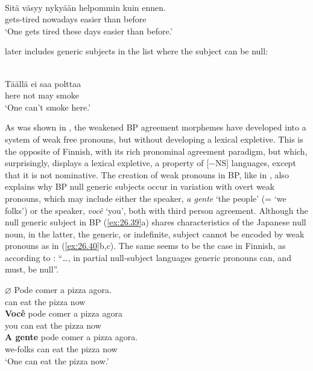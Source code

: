 \documentclass[output=paper]{langsci/langscibook}
\begin{document}
\ea%
    \label{ex:26.38}\\
	\gll	Sitä väsyy          nykyään helpommin kuin ennen.\\
            \Expl{} gets-tired  nowadays easier       than before\\
	\glt	\enquote*{One gets tired these days easier than before.}
\z

\citet{Holmberg2005} later includes generic subjects in the list where the
subject can be null:

\ea%
\label{ex:26.39}\\
	\gll	Täällä  ei saa polttaa\\
			here   not may smoke\\
	\glt	\enquote*{One can't smoke here.}
\z

As was shown in , the weakened \gls{BP} agreement morphemes have developed into a system of weak free
pronouns, but without developing a lexical expletive. This is the opposite of
Finnish, with its rich pronominal agreement paradigm, but which, surprisingly,
displays a lexical expletive, a property of [$-$NS] languages, except that it is
not nominative.   The creation of weak pronouns in \gls{BP}, like in , also explains why \gls{BP} null generic subjects occur in variation with overt weak pronouns,
which may include either the speaker, \emph{a gente} \enquote*{the people} (=
\enquote*{we folks}) or the speaker, \emph{você} \enquote*{you}, both with
third person agreement.  Although the null generic subject in
\gls{BP} (\ref{ex:26.39}a) shares characteristics of
the Japanese null noun, in the latter, the generic, or indefinite, subject
cannot be encoded by weak pronouns as in (\ref{ex:26.40}b,c).  The same
seems to be the case in Finnish, as according to \citet[540]{Holmberg2005}:
“\dots, in partial null-subject languages generic pronouns can, and must, be
null”.

\ea%
    \label{ex:26.40}
    \ea
	\gll	\textbf{$\varnothing$}  Pode comer a pizza agora.\\
    {} can eat     the pizza now\\
    \ex
	\gll	\textbf{Você} pode comer a pizza agora\\
			you can     eat the pizza  now\\
    \ex
	\gll	\textbf{A gente} pode comer a pizza agora.\\
			we-folks can eat      the pizza now\\
	\glt	\enquote*{One can eat the pizza now.}
    \z
\z
\end{document}
